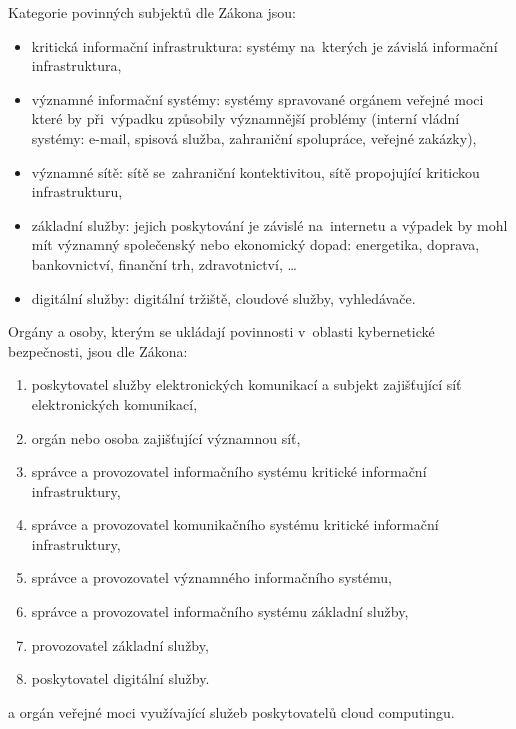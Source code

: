 Kategorie povinných subjektů dle Zákona jsou:

\begin{itemize}
\item kritická informační infrastruktura: systémy na~kterých je závislá informační infrastruktura,
\item významné informační systémy: systémy spravované orgánem veřejné moci které by při~výpadku způsobily významnější problémy (interní vládní systémy: e-mail, spisová služba, zahraniční spolupráce, veřejné zakázky),
\item významné sítě: sítě se~zahraniční kontektivitou, sítě propojující kritickou infrastrukturu,
\item základní služby: jejich poskytování je závislé na~internetu a výpadek by mohl mít významný společenský nebo ekonomický dopad: energetika, doprava, bankovnictví, finanční trh, zdravotnictví, \dots
\item digitální služby: digitální tržiště, cloudové služby, vyhledávače.
\end{itemize}

Orgány a osoby, kterým se ukládají povinnosti v~oblasti kybernetické bezpečnosti, jsou dle Zákona:

\begin{enumerate}[label=\alph*)]
\item poskytovatel služby elektronických komunikací a subjekt zajišťující síť elektronických komunikací,
\item orgán nebo osoba zajišťující významnou síť,
\item správce a provozovatel informačního systému kritické informační infrastruktury,
\item správce a provozovatel komunikačního systému kritické informační infrastruktury,
\item správce a provozovatel významného informačního systému,
\item správce a provozovatel informačního systému základní služby,
\item provozovatel základní služby,
\item poskytovatel digitální služby.
\end{enumerate}

a orgán veřejné moci využívající služeb poskytovatelů cloud computingu.



